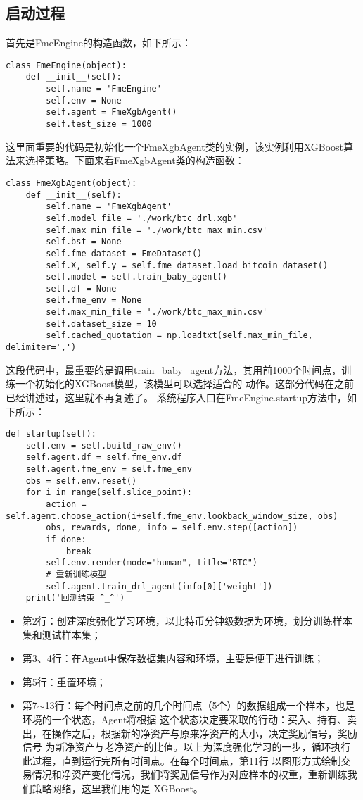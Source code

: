 \documentclass{article}
\begin{document}
\subsection{启动过程}
首先是FmeEngine的构造函数，如下所示：
\begin{lstlisting}
class FmeEngine(object):
    def __init__(self):
        self.name = 'FmeEngine'
        self.env = None
        self.agent = FmeXgbAgent()
        self.test_size = 1000
\end{lstlisting}
这里面重要的代码是初始化一个FmeXgbAgent类的实例，该实例利用XGBoost算法来选择策略。下面来看FmeXgbAgent类的构造函数：
\begin{lstlisting}
class FmeXgbAgent(object):
    def __init__(self):
        self.name = 'FmeXgbAgent'
        self.model_file = './work/btc_drl.xgb'
        self.max_min_file = './work/btc_max_min.csv'
        self.bst = None
        self.fme_dataset = FmeDataset()
        self.X, self.y = self.fme_dataset.load_bitcoin_dataset()
        self.model = self.train_baby_agent()
        self.df = None
        self.fme_env = None
        self.max_min_file = './work/btc_max_min.csv'
        self.dataset_size = 10
        self.cached_quotation = np.loadtxt(self.max_min_file, delimiter=',')
\end{lstlisting}
这段代码中，最重要的是调用train\_baby\_agent方法，其用前1000个时间点，训练一个初始化的XGBoost模型，该模型可以选择适合的
动作。这部分代码在之前已经讲述过，这里就不再复述了。\newline
系统程序入口在FmeEngine.startup方法中，如下所示：
\begin{lstlisting}
def startup(self):
    self.env = self.build_raw_env()
    self.agent.df = self.fme_env.df
    self.agent.fme_env = self.fme_env
    obs = self.env.reset()
    for i in range(self.slice_point):
        action = self.agent.choose_action(i+self.fme_env.lookback_window_size, obs)
        obs, rewards, done, info = self.env.step([action])
        if done:
            break
        self.env.render(mode="human", title="BTC")
        # 重新训练模型
        self.agent.train_drl_agent(info[0]['weight'])
    print('回测结束 ^_^')
\end{lstlisting}
\begin{itemize}
\item 第2行：创建深度强化学习环境，以比特币分钟级数据为环境，划分训练样本集和测试样本集；
\item 第3、4行：在Agent中保存数据集内容和环境，主要是便于进行训练；
\item 第5行：重置环境；
\item 第7$\sim$13行：每个时间点之前的几个时间点（5个）的数据组成一个样本，也是环境的一个状态，Agent将根据
这个状态决定要采取的行动：买入、持有、卖出，在操作之后，根据新的净资产与原来净资产的大小，决定奖励信号，奖励信号
为新净资产与老净资产的比值。以上为深度强化学习的一步，循环执行此过程，直到运行完所有时间点。在每个时间点，第11行
以图形方式绘制交易情况和净资产变化情况，我们将奖励信号作为对应样本的权重，重新训练我们策略网络，这里我们用的是
XGBoost。
\end{itemize}
\end{document}
